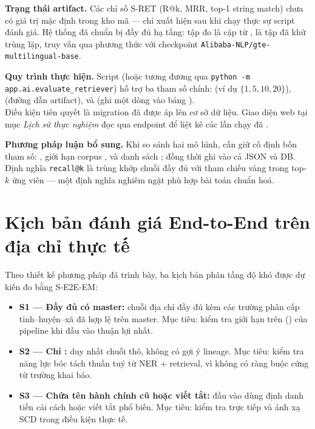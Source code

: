 \textbf{Trạng thái artifact.} Các chỉ số S-RET (R@k, MRR, top-1 string match) chưa có giá trị mặc định trong kho mã --- chỉ xuất hiện sau khi chạy thực sự script đánh giá. Hệ thống đã chuẩn bị đầy đủ hạ tầng: tập đo là cặp  từ ,  là tập  đã khử trùng lặp, truy vấn qua phương thức  với checkpoint \texttt{Alibaba-NLP/gte-multilingual-base}.

\textbf{Quy trình thực hiện.} Script  (hoặc tương đương qua \texttt{python -m app.ai.evaluate\_retriever}) hỗ trợ ba tham số chính:  (ví dụ \(\{1, 5, 10, 20\}\)),  (đường dẫn artifact), và  (ghi một dòng vào bảng ).\\
Điều kiện tiên quyết là migration  đã được áp lên cơ sở dữ liệu. Giao diện web tại mục \emph{Lịch sử thực nghiệm} đọc qua endpoint  để liệt kê các lần chạy đã .

\textbf{Phương pháp luận bổ sung.} Khi so sánh hai  mô hình, cần giữ cố định bốn tham số: , giới hạn corpus ,  và danh sách ; đồng thời ghi  vào cả JSON và DB. Định nghĩa \texttt{recall@k} là trùng khớp chuỗi đầy đủ với tham chiếu vàng trong top-\(k\) ứng viên --- một định nghĩa nghiêm ngặt phù hợp bài toán chuẩn hoá.

\section{Kịch bản đánh giá End-to-End trên địa chỉ thực tế}
\label{sec:exp-e2e}

Theo thiết kế phương pháp đã trình bày, ba kịch bản phân tầng độ khó được dự kiến đo bằng S-E2E-EM:

\begin{itemize}[leftmargin=*]
\item \textbf{S1 --- Đầy đủ có master:} chuỗi địa chỉ đầy đủ kèm các trường phân cấp tỉnh--huyện--xã đã hợp lệ trên master. Mục tiêu: kiểm tra giới hạn trên () của pipeline khi đầu vào thuận lợi nhất.
\item \textbf{S2 --- Chỉ :} duy nhất chuỗi thô, không có gợi ý lineage. Mục tiêu: kiểm tra năng lực bóc tách thuần tuý từ NER + retrieval, vì không có ràng buộc cứng từ trường khai báo.
\item \textbf{S3 --- Chứa tên hành chính cũ hoặc viết tắt:} đầu vào dùng định danh tiền cải cách hoặc viết tắt phổ biến. Mục tiêu: kiểm tra trực tiếp  và ánh xạ SCD trong điều kiện thực tế.
\end{itemize}

